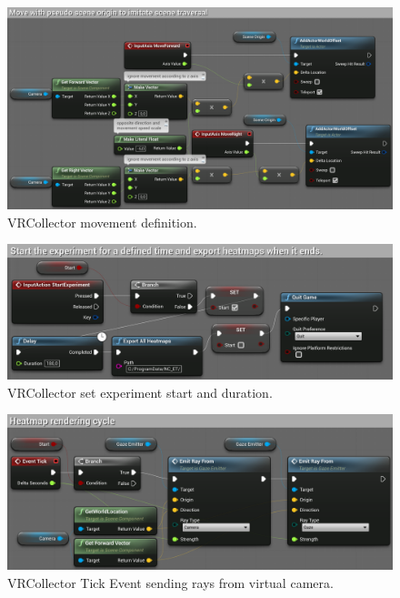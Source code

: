 \begin{figure}[!ht]\centering
    \includegraphics[width=\textwidth]{img/vr-pawn-movement.png}
    \caption{VRCollector movement definition.}
    \label{fig:vr-pawn-movement}
\end{figure}

\pagebreak{}

\begin{figure}[!ht]\centering
    \includegraphics[width=\textwidth]{img/experiment-definition.png}
    \caption{VRCollector set experiment start and duration.}
    \label{fig:experiment-definition}
\end{figure}

\begin{figure}[!ht]\centering
    \includegraphics[width=\textwidth]{img/heatmap-rendering-cycle.png}
    \caption{VRCollector Tick Event sending rays from virtual camera.}
    \label{fig:heatmap-rendering-cycle}
\end{figure}

